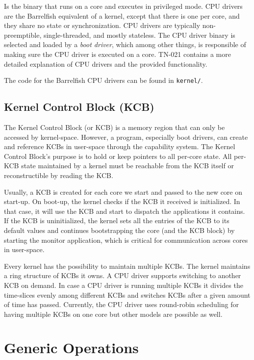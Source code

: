 \documentclass[a4paper,11pt,twoside]{report}
\begin{document}
{{Is the binary that runs on a core and executes in privileged mode. CPU drivers
are the Barrelfish equivalent of a kernel, except that there is one per core,
and they share no state or synchronization. CPU drivers are typically
non-preemptible, single-threaded, and mostly stateless. The CPU driver binary is
selected and loaded by a \textit{boot driver}, which among other things, is
responsible of making sure the CPU driver is executed on a core. TN-021 contains
a more detailed explanation of CPU drivers and the provided functionality.

The code for the Barrelfish CPU drivers can be found in \texttt{kernel/}.

\section{Kernel Control Block (KCB)}

The Kernel Control Block (or KCB) is a memory region that can only be accessed
by kernel-space. However, a program, especially boot drivers, can create and
reference KCBs in user-space through the capability system. The Kernel Control
Block's purpose is to hold or keep pointers to all per-core state. All per-KCB
state maintained by a kernel must be reachable from the KCB itself or
reconstructible by reading the KCB.

Usually, a KCB is created for each core we start and passed to the new core on
start-up. On boot-up, the kernel checks if the KCB it received is initialized.
In that case, it will use the KCB and start to dispatch the applications it
contains. If the KCB is uninitialized, the kernel sets all the entries of the
KCB to its default values and continues bootstrapping the core (and the KCB
block) by starting the monitor application, which is critical for communication
across cores in user-space.

Every kernel has the possibility to maintain multiple KCBs. The kernel maintains
a ring structure of KCBs it owns. A CPU driver supports switching to another KCB
on demand. In case a CPU driver is running multiple KCBs it divides the
time-slices evenly among different KCBs and switches KCBs after a given amount
of time has passed. Currently, the CPU driver uses round-robin scheduling for
having multiple KCBs on one core but other models are possible as well.


\chapter{Generic Operations}
\label{chap:generic}

}}
\end{document}

